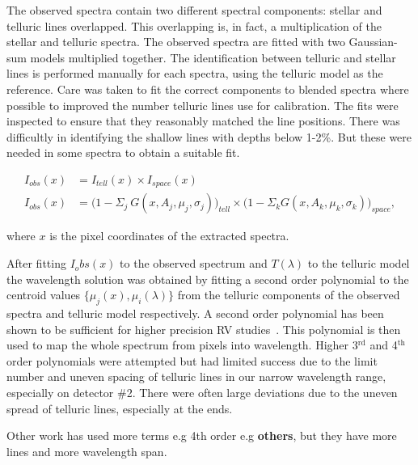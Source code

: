 The observed spectra contain two different spectral components: stellar and telluric lines overlapped. This overlapping is, in fact, a multiplication of the stellar and telluric spectra. The observed spectra are fitted with two Gaussian-sum models multiplied together. The identification between telluric and stellar lines is performed manually for each spectra, using the telluric model as the reference. Care was taken to fit the correct components to blended spectra where possible to improved the number telluric lines use for calibration. The fits were inspected to ensure that they reasonably matched the line positions. There was difficultly in identifying the shallow lines with depths below 1-2\%. But these were needed in some spectra to obtain a suitable fit.

\begin{align}
I_{obs}(x) &= I_{tell}(x) \times I_{space}(x) \nonumber \\
I_{obs}(x) &= \Big(1 - {\Sigma}_{j}\ G(x, A_{j}, {\mu}_{j}, {\sigma}_{j})\Big)_{tell} \times \Big(1 - {\Sigma}_{k} G(x, A_{k}, {\mu}_{k}, {\sigma}_{k})\Big)_{space}, \label{eqn:obs}
\end{align}

where \(x \) is the pixel coordinates of the extracted spectra.


After fitting \(I_obs(x)\) to the observed spectrum and \(T(\lambda)\) to the telluric model the wavelength solution was obtained by fitting a second order polynomial to the centroid values \(\{\mu_{j}(x), \mu_{i}(\lambda)\} \) from the telluric components of the observed spectra and telluric model respectively. A second order polynomial has been shown to be sufficient for higher precision RV studies~\citep[e.g.][]{bean_groundbased_2010, figueira_radial_2010}. This polynomial is then used to map the whole spectrum from pixels into wavelength. Higher 3$^{\textrm{rd}}$ and 4$^{\textrm{th}}$ order polynomials were attempted but had limited success due to the limit number and uneven spacing of telluric lines in our narrow wavelength range, especially on detector \#2. There were often large deviations due to the uneven spread of telluric lines, especially at the ends.

Other work has used more terms e.g 4th order e.g \citep{piskorz_evidence_2016} \textbf{others}, but they have more lines and more wavelength span.

